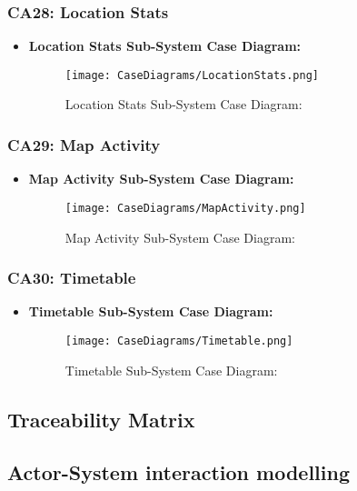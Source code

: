 \documentclass[12pt,a4paper]{article}
\begin{document}
		\subsubsection{CA28: Location Stats}
			\begin{itemize}
				\item \textbf{Location Stats Sub-System Case Diagram:}
				\begin{figure}[H]
					\texttt{[image: CaseDiagrams/LocationStats.png]}
					\caption{Location Stats Sub-System Case Diagram:}
				\end{figure}
			\end{itemize}
		\subsubsection{CA29: Map Activity}
			\begin{itemize}
				\item \textbf{Map Activity Sub-System Case Diagram:}
				\begin{figure}[H]
					\texttt{[image: CaseDiagrams/MapActivity.png]}
					\caption{Map Activity Sub-System Case Diagram:}
				\end{figure}
			\end{itemize}
		\subsubsection{CA30: Timetable}
			\begin{itemize}
				\item \textbf{Timetable Sub-System Case Diagram:}
				\begin{figure}[H]
					\texttt{[image: CaseDiagrams/Timetable.png]}
					\caption{Timetable Sub-System Case Diagram:}
				\end{figure}
			\end{itemize}

	\subsection{Traceability Matrix}
	\subsection{Actor-System interaction modelling}
\end{document}
